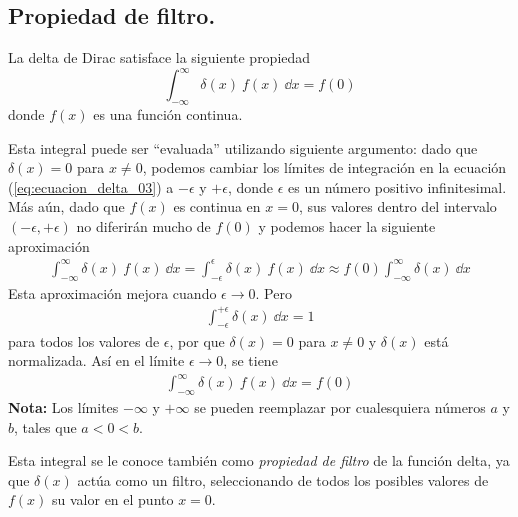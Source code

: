 \subsection{Propiedad de filtro.}
La delta de Dirac satisface la siguiente propiedad
\begin{equation}
\int_{-\infty}^{\infty} \delta (x) \: f(x) \: \dd{x} = f(0)
\label{eq:ecuacion_delta_03}
\end{equation}
donde $f(x)$ es una función continua.
\par
Esta integral puede ser \enquote{evaluada} utilizando siguiente argumento: dado que $\delta (x) = 0$
para $x \neq 0$, podemos cambiar los límites de integración en la ecuación (\ref{eq:ecuacion_delta_03}) a $- \epsilon$ y $+ \epsilon$, donde $\epsilon$ es un número positivo infinitesimal. Más aún, dado que $f(x)$ es continua en $x = 0$, sus valores dentro del intervalo $( - \epsilon, + \epsilon)$ no diferirán mucho de $f(0)$ y podemos hacer la siguiente aproximación
\begin{align*}
\int_{-\infty}^{\infty} \delta (x) \: f(x) \: \dd{x} = \int_{-\epsilon}^{\epsilon} \delta (x) \: f(x) \: \dd{x} \approx f(0) \int_{-\infty}^{\infty} \delta (x) \: \dd{x}
\end{align*}
Esta aproximación mejora cuando $\epsilon \to 0$. Pero
\begin{align*}
\int_{-\epsilon}^{+\epsilon} \delta (x) \: \dd{x} = 1
\end{align*}
para todos los valores de $\epsilon$, por que $\delta (x) = 0$ para $x \neq 0$ y $\delta (x)$ está normalizada. Así en el límite $\epsilon \to 0$, se tiene
\begin{align*}
\int_{-\infty}^{\infty} \delta (x) \: f(x) \: \dd{x} = f(0)
\end{align*}
\textbf{Nota: } Los límites $-\infty$ y $+\infty$ se pueden reemplazar por cualesquiera números $a$ y $b$, tales que $a < 0 < b$.
\par
Esta integral se le conoce también como \emph{propiedad de filtro} de la función delta, ya que $\delta (x)$ actúa como un filtro, seleccionando de todos los posibles valores de $f(x)$ su valor en el punto $x=0$.
